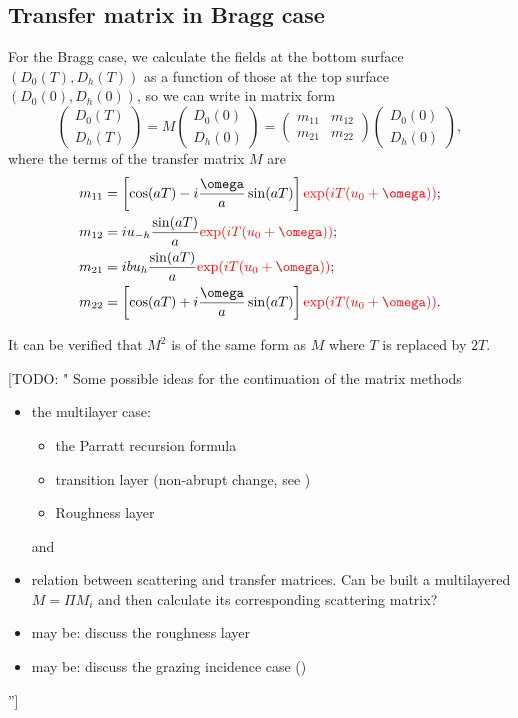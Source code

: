 \documentclass[preprint]{iucr}              %
\newcommand{\todo}[1]{{\color{red}[TODO: "#1'']}}
\newcommand{\inred}[1]{{\color{red}#1}}
\begin{document}
\subsection{Transfer matrix in Bragg case}
For the Bragg case, we calculate the fields at the bottom surface $(D_0(T),D_h(T))$ as a function of those at the top surface $(D_0(0),D_h(0))$, so we can write in matrix form
\begin{equation}
    \begin{pmatrix}
    D_0(T)\\
    D_h(T)
    \end{pmatrix}
    =
    M
        \begin{pmatrix}
    D_0(0) \\
    D_h(0)
    \end{pmatrix}
    =
    \begin{pmatrix}
    m_{11} & m_{12}\\
    m_{21} & m_{22}
    \end{pmatrix}
    \begin{pmatrix}
    D_0(0) \\
    D_h(0)
    \end{pmatrix},
\end{equation}
where the terms of the transfer matrix $M$ are 
\begin{subequations}\label{eq:scatteringMatrixBragg }
\begin{align}
m_{11} &= \left[ \cos(aT)-i\frac{\omega}{a}\sin(aT) \right] \inred{\exp(i T (u_0+\omega))};\\
m_{12} &= i u_{-h}\frac{\sin(aT)}{a} \inred{\exp(i T (u_0+\omega))};\\
m_{21} &= i b u_h \frac{\sin(aT)}{a} \inred{\exp(i T (u_0+\omega))};\\
m_{22} &= \left[ \cos(aT)+i \frac{\omega}{a}\sin(aT) \right] \inred{\exp(i T (u_0+\omega))}.
\end{align}
\end{subequations}

It can be verified that $M^2$ is of the same form as $M$ where $T$ is replaced by $2T$. 

\todo{ Some possible ideas for the continuation of the matrix methods
\begin{itemize}
    \item the multilayer case:
    \begin{itemize}
        \item the Parratt recursion formula
        \item transition layer (non-abrupt change, see \cite{Lobach})
        \item Roughness layer
    \end{itemize}and 
    \item relation between scattering and transfer matrices. Can be built a multilayered $M=\Pi M_i$ and then calculate its corresponding scattering matrix?
    \item may be: discuss the roughness layer
    \item may be: discuss the grazing incidence case (\cite{Yashiro2001, Stepanov1998})
\end{itemize}
}
\end{document}
